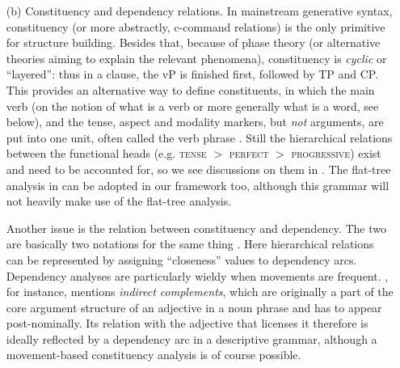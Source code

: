 \documentclass[UTF8, a4paper, oneside, scheme=plain, 12pt]{ctexrep}
\newcommand*{\citepage}[1]{p.~{#1}}
\newcommand*{\citepages}[1]{pp.~{#1}}
\newcommand*{\textgt}{$>$ }
\newcommand*{\term}[1]{\emph{#1}}
\newcommand*{\category}[1]{\textsc{#1}}
\begin{document}
{\begin{itemize}
    This traditional usage of the term \term{head} appears in the generative literature as well:
    \citet[\citepage{120}]{paul2014new}, for instance, talks about the \term{head noun} of something he calls a DP.
    The two definitions of \term{head} overlap when there is grammaticalization:
    a so-called prepositional phrase can be a complement-taking adverb phrase
    in which the \term{head preposition} is a head in the traditional sense,
    or an analytic case phrase, where the \term{head preposition} is actually a case particle and a functional head.
    The former can be reanalyzed as the latter.
    On the other hand, some functional heads, like sentence final particles
    (see e.g. ),
    are never recognized as heads in traditional grammars:
    they are instead called \term{markers} in grammars like \citet{cgel}.

    \item[(b)] Constituency and dependency relations.
    In mainstream generative syntax, constituency (or more abstractly, c-command relations) is the only primitive for structure building.
    Besides that, because of phase theory (or alternative theories aiming to explain the relevant phenomena),
    constituency is \term{cyclic} or ``layered'':
    thus in a clause, the vP is finished first, followed by TP and CP.
    This provides an alternative way to define constituents,
    in which the main verb (on the notion of what is a verb or more generally what is a word, see below),
    and the tense, aspect and modality markers, but \emph{not} arguments, are put into one unit,
    often called the verb phrase \citep[\citepage{39}]{quirk1985}.
    Still the hierarchical relations between the functional heads 
    (e.g. \category{tense} \textgt{}\category{perfect} \textgt{}\category{progressive})
    exist and need to be accounted for, so we see discussions on them in \citet[\citepages{79,121}]{quirk1985}.
    The flat-tree analysis in \citet[\citepage{39}]{quirk1985} can be adopted in our framework too,
    although this grammar will not heavily make use of the flat-tree analysis.
    
    Another issue is the relation between constituency and dependency.
    The two are basically two notations for the same thing \citep{boston2009dependency}.
    Here hierarchical relations can be represented by assigning ``closeness'' values to dependency arcs.
    Dependency analyses are particularly wieldy when movements are frequent.
    \citet[\citepage{55}]{cgel}, for instance, mentions \term{indirect complements},
    which are originally a part of the core argument structure of an adjective
    in a noun phrase and has to appear post-nominally.
    Its relation with the adjective that licenses it therefore is ideally reflected 
    by a dependency arc in a descriptive grammar,
    although a movement-based constituency analysis is of course possible.
    

\end{itemize}}
\end{document}
